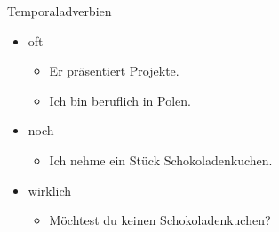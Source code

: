 \begin{syntax}{Temporaladverbien}{}
\begin{itemize}
	\item oft \begin{itemize}
		\item Er präsentiert  Projekte.
		\item Ich bin beruflich  in Polen.
	\end{itemize}
	\item noch \begin{itemize}
		\item Ich nehme  ein Stück Schokoladenkuchen.
	\end{itemize}
	\item wirklich \begin{itemize}
		\item Möchtest du  keinen Schokoladenkuchen?
	\end{itemize}
\end{itemize}
\end{syntax}
